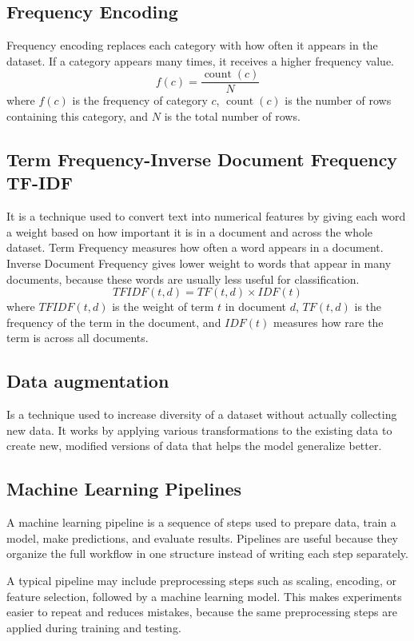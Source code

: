 \documentclass[12pt,a4paper]{report}
\begin{document}
\subsection{Frequency Encoding}
Frequency encoding replaces each category with how often it appears in the
dataset. If a category appears many times, it receives a higher frequency value.
\[
f(c) = \frac{\mathop{\mathrm{count}}(c)}{N}
\]
where $f(c)$ is the frequency of category $c$,
$\mathop{\mathrm{count}}(c)$ is the number of rows containing this category,
and $N$ is the total number of rows.

\subsection{ Term Frequency-Inverse Document Frequency TF-IDF}
It is a technique used to convert text into numerical features by giving each word a weight based
on how important it is in a document and across the whole dataset.
Term Frequency measures how often a word appears in a document. Inverse Document
Frequency gives lower weight to words that appear in many documents, because
these words are usually less useful for classification.
\[
TFIDF(t,d) = TF(t,d) \times IDF(t)
\]
where $TFIDF(t,d)$ is the weight of term $t$ in document $d$, $TF(t,d)$ is the
frequency of the term in the document, and $IDF(t)$ measures how rare the term
is across all documents.

\subsection{Data augmentation}
Is a technique used to increase diversity of a dataset without actually collecting new data. 
It works by applying various transformations to the existing data to create new, modified versions of data that helps the model generalize better.

\subsection{Machine Learning Pipelines}
A machine learning pipeline is a sequence of steps used to prepare data, train a
model, make predictions, and evaluate results. Pipelines are useful because they
organize the full workflow in one structure instead of writing each step
separately.

A typical pipeline may include preprocessing steps such as scaling, encoding, or
feature selection, followed by a machine learning model. This makes experiments
easier to repeat and reduces mistakes, because the same preprocessing steps are
applied during training and testing.
\end{document}
